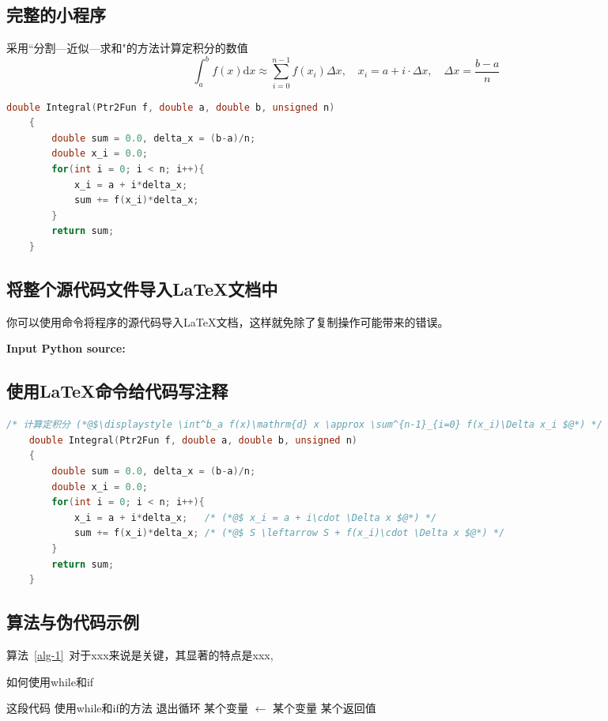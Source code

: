 \subsection{完整的小程序}
采用``分割---近似---求和"的方法计算定积分的数值
$$
\int^b_a f(x) \mathrm{d} x \approx \sum^{n-1}_{i=0} f(x_i)\Delta x, \quad x_i = a+i\cdot \Delta x, \quad \Delta x = \frac{b-a}{n}
$$
\begin{lstlisting}[language=C,frame=shadowbox,title={Integral-1.c}]
	double Integral(Ptr2Fun f, double a, double b, unsigned n)
	{
		double sum = 0.0, delta_x = (b-a)/n;
		double x_i = 0.0;
		for(int i = 0; i < n; i++){
			x_i = a + i*delta_x;
			sum += f(x_i)*delta_x;
		}
		return sum; 				
	}
\end{lstlisting}

\subsection{将整个源代码文件导入\LaTeX{}文档中}
你可以使用\verb*||命令将程序的源代码导入\LaTeX 文档，这样就免除了复制操作可能带来的错误。

\textbf{\textcolor[rgb]{0.98,0,0}{Input Python source:}}


\subsection{使用{\LaTeX{}}命令给代码写注释}

\begin{lstlisting}[language=C,frame=shadowbox,title={Integral-2.c}]
    /* 计算定积分 (*@$\displaystyle \int^b_a f(x)\mathrm{d} x \approx \sum^{n-1}_{i=0} f(x_i)\Delta x_i $@*) */
	double Integral(Ptr2Fun f, double a, double b, unsigned n)
	{
		double sum = 0.0, delta_x = (b-a)/n; 
		double x_i = 0.0;
		for(int i = 0; i < n; i++){
			x_i = a + i*delta_x;   /* (*@$ x_i = a + i\cdot \Delta x $@*) */
			sum += f(x_i)*delta_x; /* (*@$ S \leftarrow S + f(x_i)\cdot \Delta x $@*) */
		}
		return sum; 				
	}
\end{lstlisting}


\subsection{算法与伪代码示例}

算法~\ref{alg-1}~对于xxx来说是关键，其显著的特点是xxx, 

\begin{algorithm}[h]
	\caption{如何使用while和if} \label{alg-1}
	\begin{algorithmic}[1]  %
		\Require 这段代码
		\Ensure 使用while和if的方法
		\State 退出循环
		\EndIf
		\State 某个变量  $\gets$ 某个变量
		\EndWhile
		\State\Return 某个返回值
		\EndFunction
	\end{algorithmic}
\end{algorithm}

